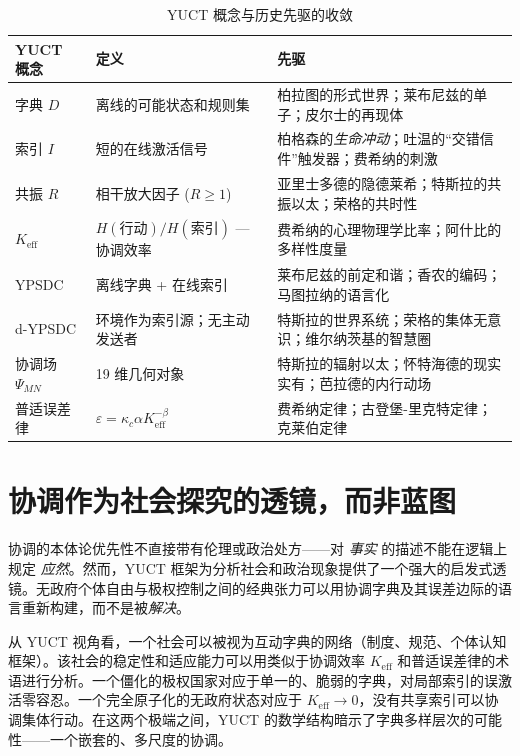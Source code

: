 \documentclass[12pt,a4paper]{article}
\begin{document}
	\begin{table}[htbp]
		\centering
		\caption{YUCT 概念与历史先驱的收敛}
		\label{tab:convergence}
		\small
		\begin{tabular}{p{2.5cm}p{4.5cm}p{4.5cm}}
			\toprule
			\textbf{YUCT 概念} & \textbf{定义} & \textbf{先驱} \\
			\midrule
			字典 \(D\) & 离线的可能状态和规则集 & 柏拉图的形式世界；莱布尼兹的单子；皮尔士的再现体 \\
			索引 \(I\) & 短的在线激活信号 & 柏格森的\emph{生命冲动}；吐温的“交错信件”触发器；费希纳的刺激 \\
			共振 \(R\) & 相干放大因子 (\(R \ge 1\)) & 亚里士多德的隐德莱希；特斯拉的共振以太；荣格的共时性 \\
			\(K_{\mathrm{eff}}\) & \(H(\text{行动})/H(\text{索引})\) — 协调效率 & 费希纳的心理物理学比率；阿什比的多样性度量 \\
			YPSDC & 离线字典 + 在线索引 & 莱布尼兹的前定和谐；香农的编码；马图拉纳的语言化 \\
			d-YPSDC & 环境作为索引源；无主动发送者 & 特斯拉的世界系统；荣格的集体无意识；维尔纳茨基的智慧圈 \\
			协调场 \(\Psi_{MN}\) & 19 维几何对象 & 特斯拉的辐射以太；怀特海德的现实实有；芭拉德的内行动场 \\
			普适误差律 & \(\varepsilon = \kappa_c \alpha K_{\mathrm{eff}}^{-\beta}\) & 费希纳定律；古登堡-里克特定律；克莱伯定律 \\
			\bottomrule
		\end{tabular}
	\end{table}
	
	\section{协调作为社会探究的透镜，而非蓝图}
	\label{sec:social-lens}
	
	协调的本体论优先性不直接带有伦理或政治处方——对 \emph{事实} 的描述不能在逻辑上规定 \emph{应然}。然而，YUCT 框架为分析社会和政治现象提供了一个强大的启发式透镜。无政府个体自由与极权控制之间的经典张力可以用协调字典及其误差边际的语言重新构建，而不是被\emph{解决}。
	
	从 YUCT 视角看，一个社会可以被视为互动字典的网络（制度、规范、个体认知框架）。该社会的稳定性和适应能力可以用类似于协调效率 \(K_{\mathrm{eff}}\) 和普适误差律的术语进行分析。一个僵化的极权国家对应于单一的、脆弱的字典，对局部索引的误激活零容忍。一个完全原子化的无政府状态对应于 \(K_{\mathrm{eff}} \to 0\)，没有共享索引可以协调集体行动。在这两个极端之间，YUCT 的数学结构暗示了字典多样层次的可能性——一个嵌套的、多尺度的协调。
	
\end{document}
